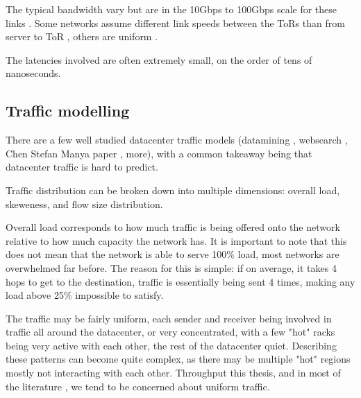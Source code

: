 The typical bandwidth vary but are in the 10Gbps to 100Gbps scale for these links .
Some networks assume different link speeds between the ToRs than from server to ToR , others are uniform . 

The latencies involved are often extremely small, on the order of tens of nanoseconds. 


\subsection{Traffic modelling} \label{model-traffic}

There are a few well studied datacenter traffic models (datamining , websearch , Chen Stefan Manya paper , more), with a common takeaway being that datacenter traffic is hard to predict.

Traffic distribution can be broken down into multiple dimensions: overall load, skeweness, and flow size distribution.


Overall load corresponds to how much traffic is being offered onto the network relative to how much capacity the network has.
It is important to note that this does not mean that the network is able to serve 100\% load, most networks are overwhelmed far before.
The reason for this is simple: if on average, it takes 4 hops to get to the destination, traffic is essentially being sent 4 times, making any load above 25\% impossible to satisfy. 

The traffic may be fairly uniform, each sender and receiver being involved in traffic all around the datacenter, or very concentrated, with a few "hot" racks being very active with each other, the rest of the datacenter quiet. 
Describing these patterns can become quite complex, as there may be multiple "hot" regions mostly not interacting with each other.
Throughput this thesis, and in most of the literature , we tend to be concerned about uniform traffic. 


